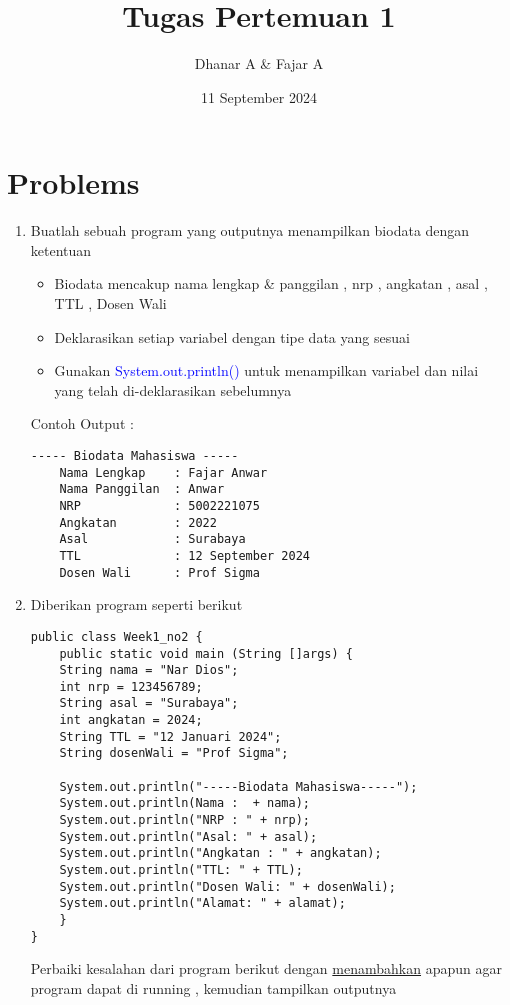 \documentclass[a4paper, 12pt]{article}
\title{Tugas Pertemuan 1}
\author{Dhanar A \& Fajar A}
\date{11 September 2024}
\newcommand{\blue}[1]{\textcolor{blue}{#1}}
\begin{document}
\maketitle

\section*{Problems}
\begin{enumerate}
    \item Buatlah sebuah program yang outputnya menampilkan biodata dengan ketentuan 
    \begin{itemize}
        \item Biodata mencakup nama lengkap \& panggilan , nrp , angkatan , asal , TTL , Dosen Wali
        \item Deklarasikan setiap variabel dengan tipe data yang sesuai 
        \item Gunakan \blue{System.out.println()} untuk menampilkan variabel dan nilai yang telah di-deklarasikan sebelumnya
    \end{itemize}
    Contoh Output : 
    \begin{lstlisting}[style=output]
                ----- Biodata Mahasiswa -----
    Nama Lengkap    : Fajar Anwar
    Nama Panggilan  : Anwar
    NRP             : 5002221075
    Angkatan        : 2022
    Asal            : Surabaya
    TTL             : 12 September 2024
    Dosen Wali      : Prof Sigma
    \end{lstlisting}

    \newpage
    \item Diberikan program seperti berikut 
    \begin{lstlisting}[style=standard]
public class Week1_no2 {
    public static void main (String []args) {
    String nama = "Nar Dios";
    int nrp = 123456789;
    String asal = "Surabaya";
    int angkatan = 2024;
    String TTL = "12 Januari 2024";
    String dosenWali = "Prof Sigma";
    
    System.out.println("-----Biodata Mahasiswa-----");
    System.out.println(Nama :  + nama);
    System.out.println("NRP : " + nrp);
    System.out.println("Asal: " + asal);
    System.out.println("Angkatan : " + angkatan);
    System.out.println("TTL: " + TTL);
    System.out.println("Dosen Wali: " + dosenWali);
    System.out.println("Alamat: " + alamat); 
    }
}
    \end{lstlisting}
    Perbaiki kesalahan dari program berikut dengan \underline{menambahkan} apapun agar program dapat di running , kemudian tampilkan outputnya 
\end{enumerate}
\end{document}
